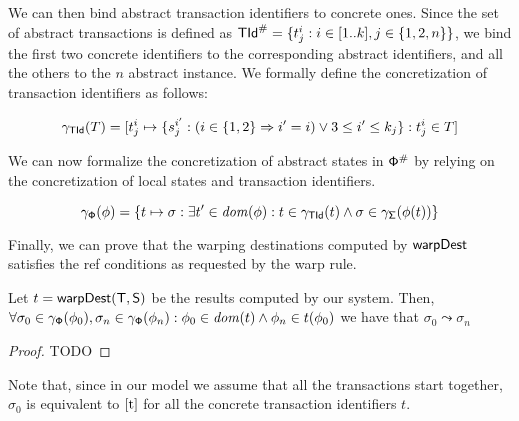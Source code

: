 We can then bind abstract transaction identifiers to concrete ones. Since the set of abstract transactions is defined as $\mathsf{\mathsf{TId}}^\# = \{t^i_j : i \in [1..k], j \in \{1, 2, n\}\}$, we bind the first two concrete identifiers to the corresponding abstract identifiers, and all the others to the $n$ abstract instance. We formally define the concretization of transaction identifiers as follows:

\[
\gamma_{\mathsf{TId}}(T) =
[
t^i_j \mapsto 
\{
s^{i'}_j : (i \in \{1, 2\} \Rightarrow i'=i) \lor 3\leq i' \leq k_j
\} : t^i_j \in T
]
\]

We can now formalize the concretization of abstract states in $\mathsf{\mathsf{\Phi}}^\#$ by relying on the concretization of local states and transaction identifiers.

\[
\gamma_{\mathsf{\Phi}}(\phi) = \{t \mapsto \sigma : \exists t' \in \mathit{dom}(\phi) : t \in \gamma_{\mathsf{TId}}(t) \land \sigma \in \gamma_{\mathsf{\Sigma}}(\phi(t))\}
\]

Finally, we can prove that the warping destinations computed by $\mathsf{warpDest}$ satisfies the {\sf ref} conditions as requested by the {\sf warp} rule.

\begin{theorem}
	Let $t=\mathsf{warpDest}(\mathsf{T}, \mathsf{S})$ be the results computed by our system. Then, $\forall \sigma_0 \in \gamma_{\mathsf{\Phi}}(\phi_0), \sigma_n \in \gamma_{\mathsf{\Phi}}(\phi_n) : \phi_0 \in \mathit{dom}(t) \land \phi_n \in t(\phi_0)$ we have that $\sigma_0 \leadsto \sigma_n$
\end{theorem}
\begin{proof}
	TODO
\end{proof}


Note that, since in our model we assume that all the transactions start together, $\sigma_0$ is equivalent to ${\ref t}$ for all the concrete transaction identifiers $t$.


